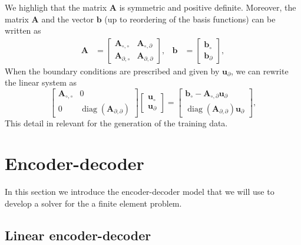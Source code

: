 We highligh that the matrix \(\mathbf{A}\) is symmetric and positive definite.
Moreover, the matrix \(\mathbf{A}\) and the vector \(\mathbf{b}\) (up to reordering of the basis functions) can be written as
\begin{align*}
    \mathbf{A} & = \begin{bmatrix}
        \mathbf{A}_{\circ, \circ} & \mathbf{A}_{\circ, \partial} \\
        \mathbf{A}_{\partial, \circ} & \mathbf{A}_{\partial, \partial}
    \end{bmatrix}, &
    \mathbf{b} & = \begin{bmatrix}
        \mathbf{b}_{\circ} \\
        \mathbf{b}_{\partial}
    \end{bmatrix},
\end{align*}
When the boundary conditions are prescribed and given by \(\mathbf{u}_{\partial}\), we can rewrite the linear system as
\begin{equation}
    \begin{bmatrix}
        \mathbf{A}_{\circ, \circ} & 0 \\
        0 & \operatorname{diag}(\mathbf{A}_{\partial, \partial})
    \end{bmatrix}
    \begin{bmatrix}
        \mathbf{u}_{\circ} \\
        \mathbf{u}_{\partial}
    \end{bmatrix}
    =
    \begin{bmatrix}
        \mathbf{b}_{\circ} - \mathbf{A}_{\circ, \partial} \mathbf{u}_{\partial} \\
        \operatorname{diag}(\mathbf{A}_{\partial, \partial}) \mathbf{u}_{\partial}
    \end{bmatrix},
\end{equation}
This detail in relevant for the generation of the training data.

\section{Encoder-decoder}
\label{sec:e-d}

In this section we introduce the encoder-decoder model that we will use to develop a solver for the a finite element problem.

\subsection{Linear encoder-decoder}


